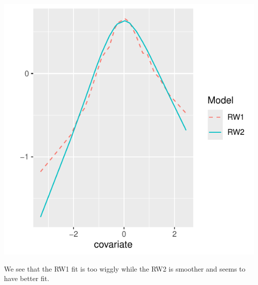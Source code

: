 \documentclass[
  letterpaper,
  DIV=11,
  numbers=noendperiod]{scrartcl}
\begin{document}
\begin{tcolorbox}
\begin{center}
\includegraphics{day1_practical_files/figure-pdf/unnamed-chunk-70-1.pdf}
\end{center}

We see that the RW1 fit is too wiggly while the RW2 is smoother and
seems to have better fit.

\end{tcolorbox}
\end{document}
